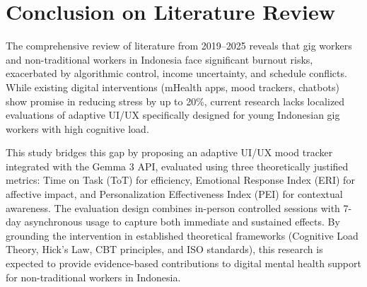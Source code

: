 \section{Conclusion on Literature Review}

The comprehensive review of literature from 2019--2025 reveals that gig workers and non-traditional workers in Indonesia face significant burnout risks, exacerbated by algorithmic control, income uncertainty, and schedule conflicts. While existing digital interventions (mHealth apps, mood trackers, chatbots) show promise in reducing stress by up to 20\%, current research lacks localized evaluations of adaptive UI/UX specifically designed for young Indonesian gig workers with high cognitive load.

This study bridges this gap by proposing an adaptive UI/UX mood tracker integrated with the Gemma 3 API, evaluated using three theoretically justified metrics: Time on Task (ToT) for efficiency, Emotional Response Index (ERI) for affective impact, and Personalization Effectiveness Index (PEI) for contextual awareness. The evaluation design combines in-person controlled sessions with 7-day asynchronous usage to capture both immediate and sustained effects. By grounding the intervention in established theoretical frameworks (Cognitive Load Theory, Hick's Law, CBT principles, and ISO standards), this research is expected to provide evidence-based contributions to digital mental health support for non-traditional workers in Indonesia.
